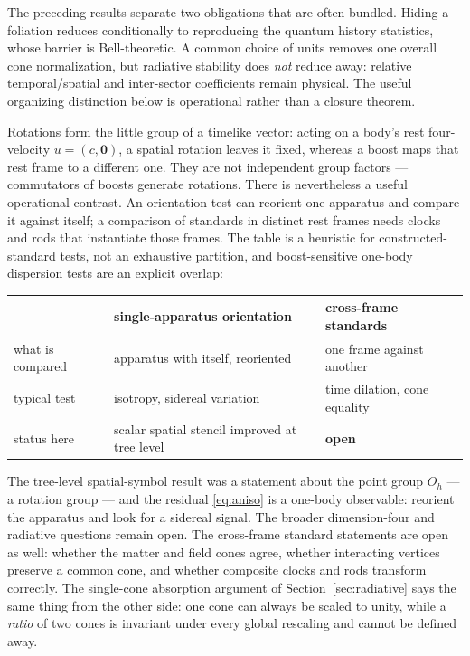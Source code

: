 \documentclass[11pt,a4paper]{article}
\theoremstyle{definition}
\theoremstyle{plain}
\theoremstyle{remark}
\begin{document}
The preceding results separate two obligations that are often bundled.
Hiding a foliation reduces conditionally to reproducing the quantum
history statistics, whose barrier is Bell-theoretic. A common choice of
units removes one overall cone normalization, but radiative stability does
\emph{not} reduce away: relative temporal/spatial and inter-sector
coefficients remain physical. The useful organizing distinction below is
operational rather than a closure theorem.

Rotations form the little group of a timelike vector: acting on a body's
rest four-velocity $u = (c,\mathbf{0})$, a spatial rotation leaves it
fixed, whereas a boost maps that rest frame to a different one. They are
not independent group factors --- commutators of boosts generate rotations.
There is nevertheless a useful operational contrast. An orientation test
can reorient one apparatus and compare it against itself; a comparison of
standards in distinct rest frames needs clocks and rods that instantiate
those frames. The table is a heuristic for constructed-standard tests, not
an exhaustive partition, and boost-sensitive one-body dispersion tests are
an explicit overlap:

\begin{center}
\small
\begin{tabular}{lll}
\toprule
& \textbf{single-apparatus orientation} & \textbf{cross-frame standards} \\
\midrule
what is compared & apparatus with itself, reoriented & one frame against another \\
typical test & isotropy, sidereal variation & time dilation, cone equality \\
status here & scalar spatial stencil improved at tree level & \textbf{open} \\
\bottomrule
\end{tabular}
\end{center}

The tree-level spatial-symbol result was a statement about the point
group $O_h$ --- a rotation group --- and the residual
\eqref{eq:aniso} is a one-body observable: reorient the apparatus and
look for a sidereal signal. The broader dimension-four and radiative
questions remain open. The cross-frame standard statements are open as
well: whether the matter and field cones agree, whether interacting
vertices preserve a common cone, and whether composite clocks and rods
transform correctly. The single-cone absorption argument of
Section~\ref{sec:radiative} says the same thing from the other side: one
cone can always be scaled to unity, while a \emph{ratio} of two cones is
invariant under every global rescaling and cannot be defined away.
\end{document}
